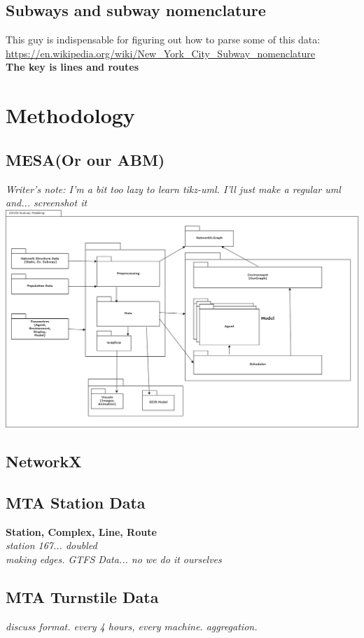 \documentclass[12pt, a4, epsf] {article}
\theoremstyle{plain}
\theoremstyle{definition}
\begin{document}
\subsection*{Subways and subway nomenclature}
This guy is indispensable for figuring out how to parse some of this data:\\
\url{https://en.wikipedia.org/wiki/New_York_City_Subway_nomenclature}\\
\textbf{The key is lines and routes}\\
\section*{Methodology}
\subsection*{MESA(Or our ABM)}
\textit{Writer's note: I'm a bit too lazy to learn tikz-uml. I'll just make a regular uml and... screenshot it\\}
\includegraphics[width = 1.0\textwidth]{Scratch_Visuals/covid_subway.png}
\subsection*{NetworkX}
\subsection*{MTA Station Data}
\textbf{Station, Complex, Line, Route\\}
\textit{station 167... doubled\\}
\textit{making edges. GTFS Data... no we do it ourselves\\}
\subsection*{MTA Turnstile Data}
\textit{discuss format. every 4 hours, every machine. aggregation.\\}
\end{document}
